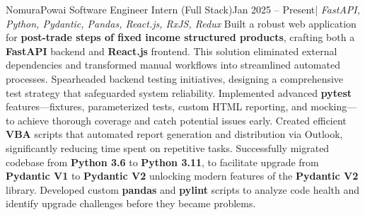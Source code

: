 \resumeSubheading
{Nomura}{Powai}
{Software Engineer Intern (Full Stack)}{Jan 2025 -- Present}{| \textit{FastAPI, Python, Pydantic, Pandas, React.js, RxJS, Redux}}
\resumeItemListStart
{}
{Built a robust web application for \textbf{post-trade steps of fixed income structured products}, crafting both a \textbf{FastAPI} backend and \textbf{React.js} frontend. This solution eliminated external dependencies and transformed manual workflows into streamlined automated processes.}
{Spearheaded backend testing initiatives, designing a comprehensive test strategy that safeguarded system reliability. Implemented advanced \textbf{pytest} features—fixtures, parameterized tests, custom HTML reporting, and mocking—to achieve thorough coverage and catch potential issues early.}
{Created efficient \textbf{VBA} scripts that automated report generation and distribution via Outlook, significantly reducing time spent on repetitive tasks.}
{Successfully migrated codebase from \textbf{Python 3.6} to \textbf{Python 3.11}, to facilitate upgrade from \textbf{Pydantic V1} to \textbf{Pydantic V2} unlocking modern features of the \textbf{Pydantic V2} library. Developed custom \textbf{pandas} and \textbf{pylint} scripts to analyze code health and identify upgrade challenges before they became problems.}
\resumeItemListEnd